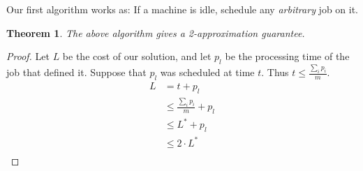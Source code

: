 \documentclass[10pt]{article}
\newtheorem{theorem}{Theorem}[section]
\begin{document}
Our first algorithm works as: If a machine is idle, schedule any \emph{arbitrary} job on it.
\begin{theorem}
The above algorithm gives a 2-approximation guarantee.
\end{theorem}
\begin{proof}
Let $L$ be the cost of our solution, and let $p_l$ be the processing time of the job that defined it. Suppose that $p_l$ was scheduled at time $t$. Thus $t \leq \frac{\sum_{i} p_i}{m}$.
\begin{align*}
L   & = t + p_l \\
    & \leq \frac{\sum_{i} p_i}{m} + p_l \\
    & \leq L^* + p_l \\
    & \leq 2 \cdot L^* \\
\end{align*}
\end{proof}
\end{document}
